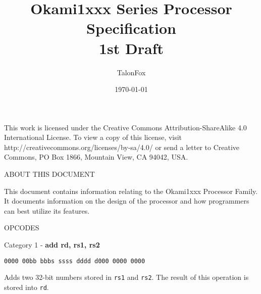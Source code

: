\documentclass{article}
\title{
    \huge Okami1xxx Series Processor Specification \\
    \LARGE 1st Draft}
\author{\Large TalonFox}
\date{\today}
\begin{document}
\maketitle
\pagebreak

\begin{Large}
\null
\vfill
\begin{center}
This work is licensed under the Creative Commons Attribution-ShareAlike 4.0 International License. To view a copy of this license, visit http://creativecommons.org/licenses/by-sa/4.0/ or send a letter to Creative Commons, PO Box 1866, Mountain View, CA 94042, USA.
\end{center}
\end{Large}
\pagebreak
\begin{flushleft}
\begin{Large}
\begin{Huge}ABOUT THIS DOCUMENT\end{Huge}\newline\newline
This document contains information relating to the Okami1xxx Processor Family. It documents information on the design of the processor
and how programmers can best utilize its features.
\end{Large}

\pagebreak
\begin{Huge}OPCODES\end{Huge}\newline\newline

\begin{large}Category 1 - \textbf{add rd, rs1, rs2}\end{large}
\begin{verbatim}0000 00bb bbbs ssss dddd d000 0000 0000\end{verbatim}
Adds two 32-bit numbers stored in \verb|rs1| and \verb|rs2|.
The result of this operation is stored into \verb|rd|.

\end{flushleft}
\end{document}
